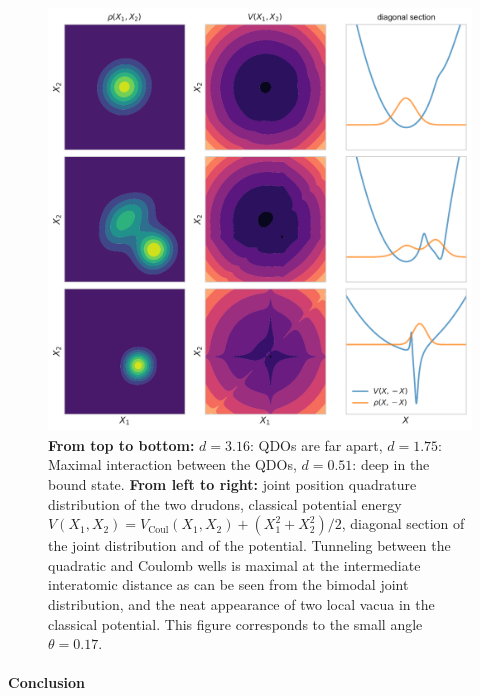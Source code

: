 \documentclass[reprint, amsmath, amssymb, aps, pra]{revtex4-2}
\begin{document}
    \begin{figure}
        \includegraphics[scale=0.85]{figures/classical_potential_small_angle.pdf}
        \caption{\label{fig:classical_potential_small_angle}\textbf{From top to bottom:} $d=3.16$: QDOs are far apart, $d=1.75$: Maximal interaction between the QDOs, $d=0.51$: deep in the bound state. \textbf{From left to right:} joint position quadrature distribution of the two drudons, classical potential energy $V(X_1,X_2) = V_\text{Coul}(X_1,X_2) + (X_1^2 + X_2^2) /2$, diagonal section of the joint distribution and of the potential. Tunneling between the quadratic and Coulomb wells is maximal at the intermediate interatomic distance as can be seen from the bimodal joint distribution, and the neat appearance of two local vacua in the classical potential. This figure corresponds to the small angle $\theta=0.17$.}
    \end{figure}

\paragraph*{Conclusion}
\end{document}

